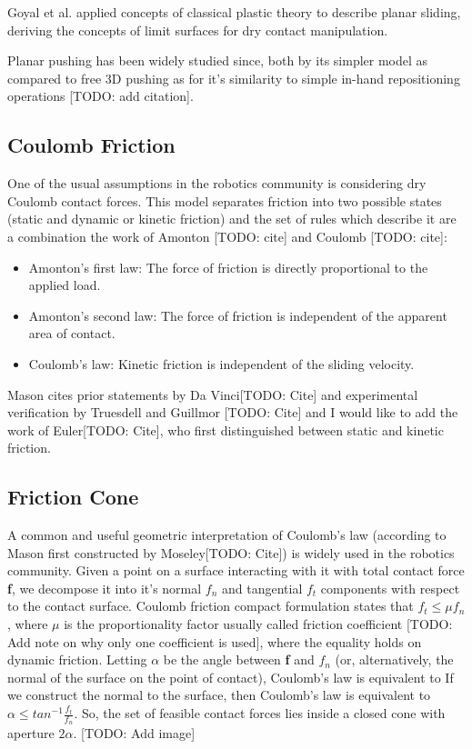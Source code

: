 \documentclass[12,twoside]{TFG-GM}
\theoremstyle{definition}
\theoremstyle{remark}
\begin{document}
Goyal et al. \cite{planar_sliding1}\cite{planar_sliding2} applied concepts of classical plastic theory to describe planar sliding, deriving the concepts of limit surfaces for dry contact manipulation.

Planar pushing has been widely studied since, both by its simpler model as compared to free 3D pushing as for it's similarity to simple in-hand repositioning operations [TODO: add citation].


\subsection{Coulomb Friction}
\label{subsec:coulomb}
One of the usual assumptions in the robotics community is considering dry Coulomb contact forces. This model separates friction into two possible states (static and dynamic or kinetic friction) and the set of rules which describe it are a combination the work of Amonton [TODO: cite] and Coulomb [TODO: cite]:
\begin{itemize}
\item{Amonton's first law:} The force of friction is directly proportional to the applied load.
\item{Amonton's second law:} The force of friction is independent of the apparent area of contact.
\item{Coulomb's law:} Kinetic friction is independent of the sliding velocity.
\end{itemize}
Mason cites prior statements by Da Vinci[TODO: Cite] and experimental verification by Truesdell and Guillmor [TODO: Cite] and I would like to add the work of Euler[TODO: Cite], who first distinguished between static and kinetic friction.

\subsection{Friction Cone}
\label{subsec:frictioncone}
A common and useful geometric interpretation of Coulomb’s law (according to Mason first constructed by Moseley[TODO: Cite]) is widely used in the robotics community. Given a point on a surface interacting with it with total contact force \textbf{f}, we decompose it into it's normal $f_n$ and tangential $f_t$ components with respect to the contact surface. Coulomb friction compact formulation states that $f_t \leq \mu f_n$, where $\mu$ is the proportionality factor usually called friction coefficient [TODO: Add note on why only one coefficient is used], where the equality holds on dynamic friction. Letting $\alpha$ be the angle between \textbf{f} and $f_n$ (or, alternatively, the normal of the surface on the point of contact), Coulomb's law is equivalent to 
If we construct the normal to the surface, then Coulomb’s law is equivalent to $\alpha \leq tan^{-1} \frac{f_t}{f_n}$. So, the set of feasible contact forces lies inside a closed cone with aperture $2\alpha$. [TODO: Add image]
\end{document}

